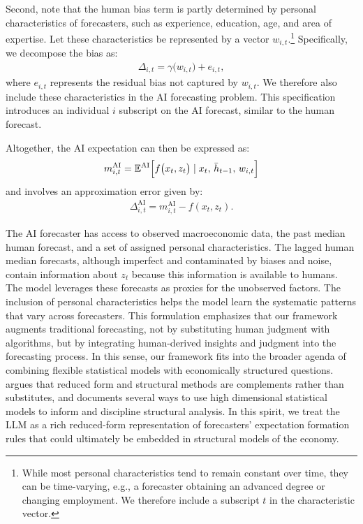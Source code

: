\documentclass[11pt,letterpaper]{scrartcl}
\begin{document}
Second, note that the human bias term is partly determined by personal characteristics of forecasters, such as experience, education, age, and area of expertise. Let these characteristics be represented by a vector \(w_{i,t}\).\footnote{While most personal characteristics tend to remain constant over time, they can be time-varying, e.g., a forecaster obtaining an advanced degree or changing employment. We therefore include a subscript $t$ in the characteristic vector.} Specifically, we decompose the bias as:
\begin{align}
    \Delta_{i,t} = \gamma\bigl(w_{i,t}\bigr) + e_{i,t},
\end{align}
where \(e_{i,t}\) represents the residual bias not captured by \(w_{i,t}\). We therefore also include these characteristics in the AI forecasting problem. This specification introduces an individual $i$ subscript on the AI forecast, similar to the human forecast.

Altogether, the AI expectation can then be expressed as:
\begin{align}
    m_{i,t}^{\text{AI}} = \mathbb{E}^{\text{AI}}\Bigl[f\bigl(x_t, z_t\bigr) \mid x_t,\,\bar{h}_{t-1},\, w_{i,t}\Bigr]
\end{align}
and involves an approximation error given by:
\begin{align}
    \Delta^\text{AI}_{i,t} = m_{i,t}^\text{AI} - f(x_t,z_t).  
\end{align}

The AI forecaster has access to observed macroeconomic data, the past median human forecast, and a set of assigned personal characteristics. The lagged human median forecasts, although imperfect and contaminated by biases and noise, contain information about $z_t$ because this information is available to humans. The model leverages these forecasts as proxies for the unobserved factors. The inclusion of personal characteristics helps the model learn the systematic patterns that vary across forecasters. This formulation emphasizes that our framework augments traditional forecasting, not by substituting human judgment with algorithms, but by integrating human-derived insights and judgment into the forecasting process. In this sense, our framework fits into the broader agenda of combining flexible statistical models with economically structured questions. \cite{whited2023integrating} argues that reduced form and structural methods are complements rather than substitutes, and documents several ways to use high dimensional statistical models to inform and discipline structural analysis. In this spirit, we treat the LLM as a rich reduced-form representation of forecasters' expectation formation rules that could ultimately be embedded in structural models of the economy.
\end{document}
